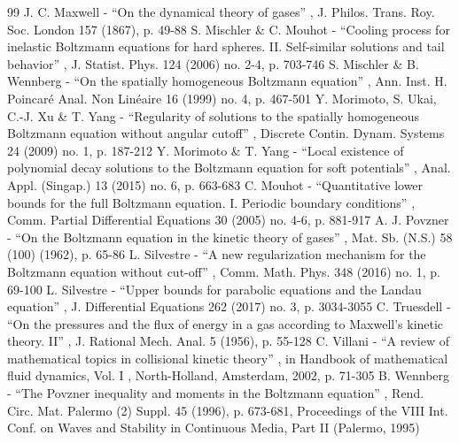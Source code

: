 \documentclass[11pt]{article}
\theoremstyle{plain}
\theoremstyle{definition}
\numberwithin{equation}{section}
\begin{document}
\begin{thebibliography}{99}
 J. C. Maxwell - “On the dynamical theory of gases” , J. Philos. Trans. Roy. Soc. London 157 (1867), p. 49-88
 S. Mischler \& C. Mouhot - “Cooling process for inelastic Boltzmann equations for hard spheres. II. Self-similar solutions and tail behavior” , J. Statist. Phys. 124 (2006) no. 2-4, p. 703-746
 S. Mischler \& B. Wennberg - “On the spatially homogeneous Boltzmann equation” , Ann. Inst. H. Poincaré Anal. Non Linéaire 16 (1999) no. 4, p. 467-501
 Y. Morimoto, S. Ukai, C.-J. Xu \& T. Yang - “Regularity of solutions to the spatially homogeneous Boltzmann equation without angular cutoff” , Discrete Contin. Dynam. Systems 24 (2009) no. 1, p. 187-212
 Y. Morimoto \& T. Yang - “Local existence of polynomial decay solutions to the Boltzmann equation for soft potentials” , Anal. Appl. (Singap.) 13 (2015) no. 6, p. 663-683
 C. Mouhot - “Quantitative lower bounds for the full Boltzmann equation. I. Periodic boundary conditions” , Comm. Partial Differential Equations 30 (2005) no. 4-6, p. 881-917
 A. J. Povzner - “On the Boltzmann equation in the kinetic theory of gases” , Mat. Sb. (N.S.) 58 (100) (1962), p. 65-86
 L. Silvestre - “A new regularization mechanism for the Boltzmann equation without cut-off” , Comm. Math. Phys. 348 (2016) no. 1, p. 69-100
 L. Silvestre - “Upper bounds for parabolic equations and the Landau equation” , J. Differential Equations 262 (2017) no. 3, p. 3034-3055
 C. Truesdell - “On the pressures and the flux of energy in a gas according to Maxwell’s kinetic theory. II” , J. Rational Mech. Anal. 5 (1956), p. 55-128
 C. Villani - “A review of mathematical topics in collisional kinetic theory” , in Handbook of mathematical fluid dynamics, Vol. I , North-Holland, Amsterdam, 2002, p. 71-305
 B. Wennberg - “The Povzner inequality and moments in the Boltzmann equation” , Rend. Circ. Mat. Palermo (2) Suppl. 45 (1996), p. 673-681, Proceedings of the VIII Int. Conf. on Waves and Stability in Continuous Media, Part II (Palermo, 1995)
\end{thebibliography}
\end{document}

